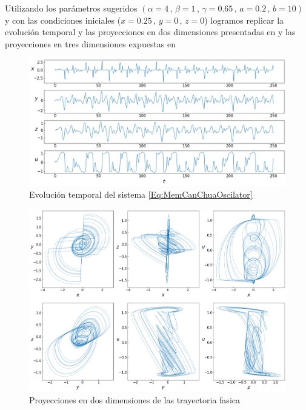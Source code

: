 \documentclass[11pt,letterpaper]{article}
\begin{document}
\begin{multicols*}{2}
Utilizando los parámetros sugeridos $(\alpha\!=\!4 \,,\, \beta\!=\!1 \,,\, \gamma\!=\!0.65 \,,\,a\!=\!0.2 \,,\, b\!=\!10)$ y con las condiciones iniciales ($x\!=\!0.25\,,\,y\!=\!0\,,\,z\!=\!0$) logramos replicar la evolución temporal y las proyecciones en dos dimensiones presentadas en \cite{Buscarino2012a} y las proyecciones en tres dimensiones expuestas en \cite{Itoh2008} 

\begin{figure}[H]
    \centering
    \includegraphics[scale=0.245]{Memristor-basedCanonicalChuaOscillator1D.png}
    \caption{Evolución temporal del sistema \ref{Eq:MemCanChuaOscilator}}
    \label{Fig:MemCanChuaOscilator1D}
\end{figure}

\begin{figure}[H]
    \centering
    \includegraphics[scale=0.205]{Memristor-basedCanonicalChuaOscillator2Dv2.png}
    \caption{Proyecciones en dos dimensiones de las trayectoria fasica}
    \label{Fig:MemCanChuaOscilator2D}
\end{figure}


\end{multicols*}
\end{document}
